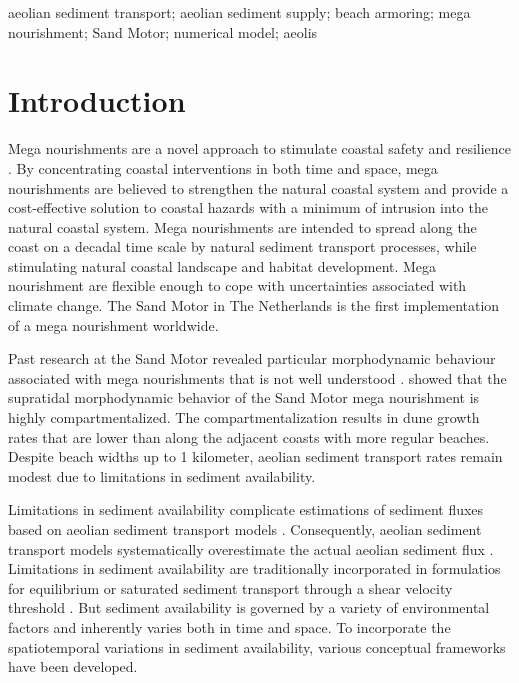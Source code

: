 \documentclass[preprint,12pt,authoryear]{elsarticle}
\begin{document}
\begin{frontmatter}
\begin{abstract}
  \end{abstract}

  \begin{keyword}
    aeolian sediment transport; aeolian sediment supply; beach
    armoring; mega nourishment; Sand Motor; numerical model; aeolis
  \end{keyword}

\end{frontmatter}

\section{Introduction}

Mega nourishments are a novel approach to stimulate coastal safety and
resilience \citep{Stive2013}. By concentrating coastal interventions
in both time and space, mega nourishments are believed to strengthen
the natural coastal system and provide a cost-effective solution to
coastal hazards with a minimum of intrusion into the natural coastal
system. Mega nourishments are intended to spread along the coast on a
decadal time scale by natural sediment transport processes, while
stimulating natural coastal landscape and habitat development. Mega
nourishment are flexible enough to cope with uncertainties associated
with climate change. The Sand Motor in The Netherlands is the first
implementation of a mega nourishment worldwide.

Past research at the Sand Motor revealed particular morphodynamic
behaviour associated with mega nourishments that is not well
understood \citep{deSchipper2016, Huisman2016,
  Radermacher2017}. \citet{Hoonhout2017a} showed that the supratidal
morphodynamic behavior of the Sand Motor mega nourishment is highly
compartmentalized. The compartmentalization results in dune growth
rates that are lower than along the adjacent coasts with more regular
beaches. Despite beach widths up to 1 kilometer, aeolian sediment
transport rates remain modest due to limitations in sediment
availability.

Limitations in sediment availability complicate estimations of
sediment fluxes based on aeolian sediment transport models
\citep[e.g.][]{Jackson1999, Lynch2008, DavidsonArnott2009,
  Aagaard2014}. Consequently, aeolian sediment transport models
systematically overestimate the actual aeolian sediment flux
\citep{Sherman1998, Sherman2012}. Limitations in sediment availability
are traditionally incorporated in formulatios for equilibrium or
saturated sediment transport through a shear velocity threshold
\citep[e.g.][]{Howard1977, Dyer1986, Belly1964, Johnson1965,
  Hotta1984, Nickling1981, Arens1996, King2005}. But sediment
availability is governed by a variety of environmental factors and
inherently varies both in time and space. To incorporate the
spatiotemporal variations in sediment availability, various conceptual
frameworks have been developed.
\end{document}

